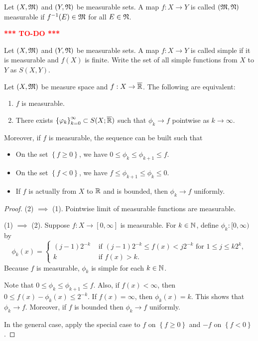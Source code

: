 \documentclass[a4paper]{article}
\newcommand{\TODO}{\textcolor{red}{\textbf{*** TO-DO ***}}}
\begin{document}
\begin{defi}
  Let $(X, \mathfrak{M})$ and $(Y, \mathfrak{N})$ be measurable sets. A map 
  $f : X \to Y$ is called $(\mathfrak{M}, \mathfrak{N})$ measurable if $f^{-1}(E) 
  \in \mathfrak{M}$ for all $E \in \mathfrak{N}$.
\end{defi}

\TODO

\begin{defi}
  Let $(X, \mathfrak{M})$ and $(Y, \mathfrak{N})$ be measurable sets. A map 
  $f : X \to Y$ is called simple if it is 
  measurable and $f(X)$ is finite. Write the set of all 
  simple functions from $X$ to $Y$ as 
  $S(X, Y)$.
\end{defi}

\begin{thm}
  Let $(X, \mathfrak{M})$ be measure space and $f : X \to \overline{\mathbb{R}}$. The 
  following are equivalent: 
  \begin{enumerate}
    \item $f$ is measurable. 
    \item There exists $\left\{ \varphi_k \right\}_{k=0}^\infty \subset S(X; \overline{\mathbb{R}})$ such that 
    $\phi_k \to f$ pointwise as $k \to \infty$.
  \end{enumerate}
  Moreover, if $f$ is measurable, the sequence can be built such that 
  \begin{itemize}
    \item On the set $\left\{ f \geq 0 \right\}$, we have 
    $0 \leq \phi_k \leq \phi_{k+1} \leq f$.
    \item On the set $\left\{ f < 0 \right\}$, we have 
    $f \leq \phi_{k+1} \leq \phi_k \leq 0$.
    \item If $f$ is actually from $X$ to $\mathbb{R}$ and is bounded, 
    then $\phi_k \to f$ uniformly.
  \end{itemize}
\end{thm}

\begin{proof}
  (2) $\implies$ (1). Pointwise limit of measurable
  functions are measurable.

  (1) $\implies$ (2). Suppose $f : X \to [0, \infty]$
  is measurable. For $k \in \mathbb{N}$, define  
  $\phi_k : [0, \infty)$ by 
  \[
  \phi_k(x) = \begin{cases}
    (j - 1)2^{-k} & \text{ if 
    $(j - 1)2^{-k} \leq f(x) < j 2^{-k}$  
    for $1 \leq j \leq k 2^k$}, \\
    k & \text{ if $f(x) > k$}.
  \end{cases}
  \]
  Because $f$ is measurable, $\phi_k$ is simple for each 
  $k \in \mathbb{N}$. 

  Note that $0 \leq \phi_k \leq \phi_{k+1} \leq f$. Also, 
  if $f(x) < \infty$, then $0 \leq f(x) - \phi_k(x) \leq
  2^{-k}$. If $f(x) = \infty$, then $\phi_k(x) = k$.
  This shows that $\phi_k \to f$. Moreover, 
  if $f$ is bounded then $\phi_k \to f$ uniformly. 

  In the general case, apply the special case to $f$ on 
  $\left\{ f \geq 0 \right\}$ and $-f$ on 
  $\left\{ f < 0 \right\}$.

\end{proof}
\end{document}
